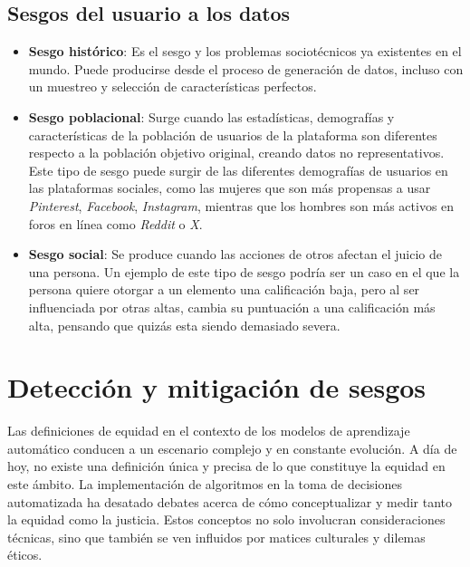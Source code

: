     \subsection{Sesgos del usuario a los datos}

    \begin{itemize}
        \item \textbf{Sesgo hist\'orico}: Es el sesgo y los problemas sociot\'ecnicos ya existentes en el mundo. Puede 
        producirse desde el proceso de generaci\'on de datos, incluso con un muestreo y selecci\'on de caracter\'isticas perfectos.
        
        \item \textbf{Sesgo poblacional}: Surge cuando las estad\'isticas, demograf\'ias y caracter\'isticas 
        de la poblaci\'on de usuarios de la plataforma son diferentes respecto a la poblaci\'on objetivo original, creando datos no
        representativos. Este tipo de sesgo puede surgir de las diferentes demograf\'ias de usuarios en las plataformas sociales, como las
        mujeres que son m\'as propensas a usar \emph{Pinterest}, \emph{Facebook}, \emph{Instagram}, mientras que los hombres 
        son m\'as activos en foros en l\'inea como \emph{Reddit} o \emph{X}.

        \item \textbf{Sesgo social}: Se produce cuando las acciones de otros afectan el juicio de una persona. Un ejemplo de este tipo de 
        sesgo podr\'ia ser un caso en el que la persona quiere otorgar a un elemento una calificaci\'on baja, pero al ser influenciada por otras
        altas, cambia su puntuaci\'on a una calificaci\'on m\'as alta, pensando que quiz\'as esta siendo demasiado severa.
    \end{itemize}

\section{Detecci\'on y mitigaci\'on de sesgos}

Las definiciones de equidad en el contexto de los modelos de aprendizaje autom\'atico conducen 
a un escenario complejo y en constante evoluci\'on. A d\'ia de hoy, no existe una definici\'on \'unica y precisa
de lo que constituye la equidad en este \'ambito. La implementaci\'on de algoritmos en la toma de decisiones automatizada ha desatado 
debates acerca de c\'omo conceptualizar y medir tanto la equidad como la justicia. Estos conceptos no solo involucran consideraciones 
t\'ecnicas, sino que tambi\'en se ven influidos por matices culturales y dilemas \'eticos.

